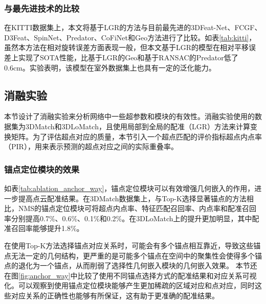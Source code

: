     \subsubsection{与最先进技术的比较}
    在KITTI数据集上，本文将基于LGR的方法与目前最先进的3DFeat-Net、FCGF、D3Feat、SpinNet、Predator、CoFiNet和Geo方法进行了比较。如表\ref{tab:kitti}，虽然本方法在相对旋转误差方面表现一般，但本文基于LGR的模型在相对平移误差上实现了SOTA性能，比基于LGR的Geo和基于RANSAC的Predator低了0.6cm。实验表明，该模型在室外数据集上也具有一定的泛化能力。
    


    \subsection{消融实验}
    本节设计了消融实验来分析网络中一些超参数和模块的有效性。消融实验使用的数据集为3DMatch和3DLoMatch，且使用局部到全局的配准（LGR）方法来计算变换矩阵。为了评估超点对应的质量，本节引入一个超点匹配的评价指标超点内点率（PIR），用来表示预测的超点对应之间的实际重叠率。\par

    \subsubsection{锚点定位模块的效果}
    如表\ref{tab:ablation_anchor_way}，锚点定位模块可以有效增强几何嵌入的作用，进一步提高点云配准结果。在3DMatch数据集上，与Top-K选择显著锚点的方法相比，NMS的锚点定位模块可将超点内点率、特征匹配召回率、内点率和配准召回率分别提高0.7\%、0.6\%、0.1\%和0.2\%。在3DLoMatch上的提升更加明显，其中配准召回率能够提升1.8\%。
    
    在使用Top-K方法选择锚点对应关系时，可能会有多个锚点相互靠近，导致这些锚点无法一定的几何结构，更严重的是可能多个锚点在空间中的聚集性会使得多个锚点的退化为一个锚点，从而削弱了选择性几何嵌入模块的几何嵌入效果。
    本节还在图\ref{fig:anchor_way}中比较了使用不同锚点选择方式的配准结果和对应关系可视化。可以观察到使用锚点定位模块能够产生更加稀疏的区域对应和点对应，同时这些对应关系的正确性也能够有所保证，这有助于更准确的配准结果。\par

